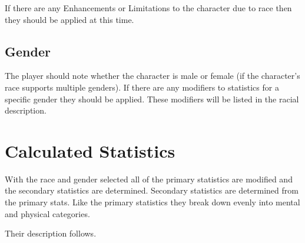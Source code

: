 If there are any Enhancements or Limitations to the character due to race
then they should be applied at this time.

\subsection{Gender}

The player should note whether the character is male or
female (if the character's race supports multiple genders). If there are
any modifiers to statistics for a specific gender they should be applied.
These modifiers will be listed in the racial description.

\section{Calculated Statistics}

With the race and gender selected all of the primary statistics are modified 
and the secondary statistics are determined. Secondary statistics are 
determined from the primary stats. Like the primary statistics they break 
down evenly into mental and physical categories.

Their description follows.

